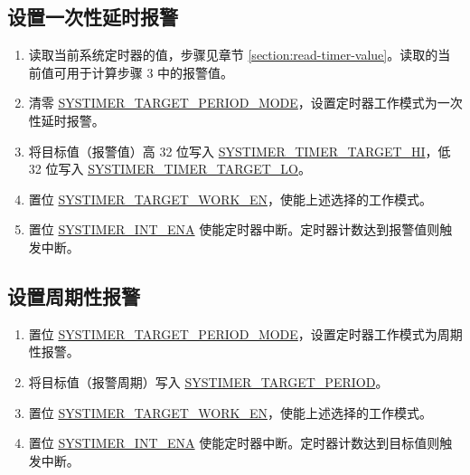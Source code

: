 \documentclass[main\_\_CN.tex]{subfiles}
\begin{document}
\subsection{设置一次性延时报警}
\begin{enumerate}
    \item 读取当前系统定时器的值，步骤见章节 \ref{section:read-timer-value}。读取的当前值可用于计算步骤 3 中的报警值。
    \item 清零 \hyperref[fielddesc:SYSTIMERTARGET0PERIODMODE]{ SYSTIMER\_TARGET\_PERIOD\_MODE}，设置定时器工作模式为一次性延时报警。
    \item 将目标值（报警值）高 32 位写入 \hyperref[fielddesc:SYSTIMERTIMERTARGET0HI]{SYSTIMER\_TIMER\_TARGET\_HI}，低 32 位写入 \hyperref[fielddesc:SYSTIMERTIMERTARGET0LO]{SYSTIMER\_TIMER\_TARGET\_LO}。
    \item 置位 \hyperref[fielddesc:SYSTIMERTARGET0WORKEN]{ SYSTIMER\_TARGET\_WORK\_EN}，使能上述选择的工作模式。
    \item 置位 \hyperref[fielddesc:SYSTIMERINT0ENA]{SYSTIMER\_INT\_ENA} 使能定时器中断。定时器计数达到报警值则触发中断。
\end{enumerate}

\subsection{设置周期性报警}
\begin{enumerate}
    \item 置位 \hyperref[fielddesc:SYSTIMERTARGET0PERIODMODE]{ SYSTIMER\_TARGET\_PERIOD\_MODE}，设置定时器工作模式为周期性报警。
    \item 将目标值（报警周期）写入 \hyperref[fielddesc:SYSTIMERTARGET0PERIOD]{SYSTIMER\_TARGET\_PERIOD}。
    \item 置位 \hyperref[fielddesc:SYSTIMERTARGET0WORKEN]{ SYSTIMER\_TARGET\_WORK\_EN}，使能上述选择的工作模式。
    \item 置位 \hyperref[fielddesc:SYSTIMERINT0ENA]{SYSTIMER\_INT\_ENA} 使能定时器中断。定时器计数达到目标值则触发中断。
\end{enumerate}
\end{document}
